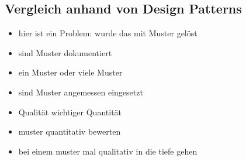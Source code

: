 \subsection{Vergleich anhand von Design Patterns}
\begin{itemize}
    \item hier ist ein Problem: wurde das mit Muster gelöst
    \item sind Muster dokumentiert
    \item ein Muster oder viele Muster
    \item sind Muster angemessen eingesetzt
    \item Qualität wichtiger Quantität
    \item muster quantitativ bewerten
    \item bei einem muster mal qualitativ in die tiefe gehen
\end{itemize}
